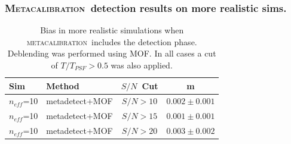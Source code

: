 \documentclass{beamer}
\newcommand{\mcal}{\textsc{metacalibration}}
\newcommand{\Mcal}{\textsc{Metacalibration}}
\newcommand{\snr}{$S/N$}
\newcommand{\neff}{$n_{eff}$}
\begin{document}
\begin{frame}
    \frametitle{\Mcal\ detection results on more realistic sims.}

 
    \begin{table}
        \centering
        \begin{tabular}{|l|l|c|c|}
            \hline
            Sim & Method         & \snr\ Cut & m             \\
            \hline

            \hline
            \neff=10    & metadetect+MOF    & \snr$ > 10$ & $0.002 \pm 0.001$  \\
            \neff=10    & metadetect+MOF    & \snr$ > 15$ & $0.001 \pm 0.001$  \\
            \neff=10    & metadetect+MOF    & \snr$ > 20$ & $0.003 \pm 0.002$  \\
            \hline

        \end{tabular}
        \caption{Bias in more realistic simulations when \mcal\ includes
            the detection phase.  Deblending was performed using MOF. 
            In all cases a cut of $T/T_{PSF} > 0.5$ was also applied.
        \label{tab:mcal:deblending}}
    \end{table}


\end{frame}
\end{document}
